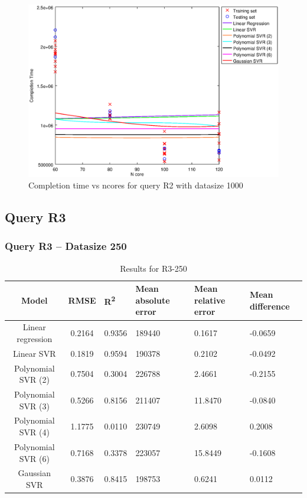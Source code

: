 \documentclass[a4paper,11pt]{article}
\begin{document}
\begin {figure}[hbtp]
\centering
\includegraphics[width=\textwidth]{output/R2_1000_LINEAR_NCORE/plot_R2_1000.eps}
\caption{Completion time vs ncores for query R2 with datasize 1000}
\label{fig:all_linear_R2_1000}
\end {figure}

\newpage
\subsection{Query R3}
\subsubsection{Query R3 -- Datasize 250}
\begin{table}[H]
	\centering
	\begin{adjustbox}{center}
		\begin{tabular}{c | c M{1.2cm} M{2.5cm} M{2.5cm} M{1.8cm}}
			Model & RMSE & R\textsuperscript{2} & Mean absolute error & Mean relative error & Mean difference \tabularnewline
			\hline
			Linear regression & 0.2164 & 0.9356 & 189440 & 0.1617 & -0.0659 \\
			Linear SVR & 0.1819 & 0.9594 & 190378 & 0.2102 & -0.0492 \\
			Polynomial SVR (2) & 0.7504 & 0.3004 & 226788 & 2.4661 & -0.2155 \\
			Polynomial SVR (3) & 0.5266 & 0.8156 & 211407 & 11.8470 & -0.0840 \\
			Polynomial SVR (4) & 1.1775 & 0.0110 & 230749 & 2.6098 & 0.2008 \\
			Polynomial SVR (6) & 0.7168 & 0.3378 & 223057 & 15.8449 & -0.1608 \\
			Gaussian SVR & 0.3876 & 0.8415 & 198753 & 0.6241 & 0.0112 \\
		\end{tabular}
	\end{adjustbox}
	\\
	\caption{Results for R3-250}
	\label{fig:all_linear_R3_250}
\end{table}
\end{document}

